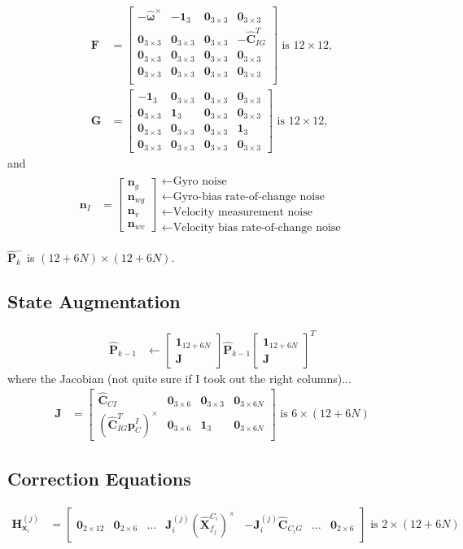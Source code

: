 \documentclass[10pt,letterpaper,fleqn,oneside]{article}
\newcommand{\nl}{\\[0.5em]}
\def\Vec#1{\mathbf{#1}} %
\newcommand{\bbm}{\begin{bmatrix}}
\newcommand{\ebm}{\end{bmatrix}}
\begin{document}
\begin{align}
\Vec{F} &= \bbm	-\hat{\boldsymbol{\omega}}^\times & -\Vec{1}_3 & \Vec{0}_{3\times3} & \Vec{0}_{3\times3} \nl
					\Vec{0}_{3\times3} & \Vec{0}_{3\times3} & \Vec{0}_{3\times3} & -\hat{\Vec{C}}_{I G}^T \nl
					\Vec{0}_{3\times3} & \Vec{0}_{3\times3} & \Vec{0}_{3\times3} & \Vec{0}_{3\times3} \nl
					\Vec{0}_{3\times3} & \Vec{0}_{3\times3} & \Vec{0}_{3\times3} & \Vec{0}_{3\times3} \nl
		\ebm \text{ is } 12\times12, \nl
\Vec{G} &= 	\bbm	-\Vec{1}_3 & \Vec{0}_{3\times3} & \Vec{0}_{3\times3} & \Vec{0}_{3\times3} \nl
								\Vec{0}_{3\times3} & \Vec{1}_3 & \Vec{0}_{3\times3} & \Vec{0}_{3\times3} \nl
								\Vec{0}_{3\times3} & \Vec{0}_{3\times3} & \Vec{0}_{3\times3} & \Vec{1}_3 \nl
								\Vec{0}_{3\times3} & \Vec{0}_{3\times3} & \Vec{0}_{3\times3} & \Vec{0}_{3\times3}
					\ebm \text{ is } 12\times12,
\end{align}
and
\begin{align}
\Vec{n}_I &= \bbm \Vec{n}_g \nl \Vec{n}_{wg} \nl \Vec{n}_v \nl \Vec{n}_{wv} \ebm
					\begin{array}{l}
					\leftarrow \text{Gyro noise} \nl
					\leftarrow \text{Gyro-bias rate-of-change noise} \nl
					\leftarrow \text{Velocity measurement noise} \nl
					\leftarrow \text{Velocity bias rate-of-change noise}
					\end{array}		
\end{align}

$\hat{\Vec{P}}^-_k$ is $(12+6N)\times(12+6N)$.

\subsection{State Augmentation}
\begin{align}
\hat{\Vec{P}}_{k-1} &\leftarrow \bbm \Vec{1}_{12+6N}  \nl \Vec{J}\ebm \hat{\Vec{P}}_{k-1} \bbm \Vec{1}_{12+6N}  \nl \Vec{J}\ebm^T
\end{align}
where the Jacobian (not quite sure if I took out the right columns)...
\begin{align}
\Vec{J} &= \bbm \hat{\Vec{C}}_{C I} & \Vec{0}_{3\times6} & \Vec{0}_{3\times3} & \Vec{0}_{3\times6N} \nl
							\left(\hat{\Vec{C}}_{I G}^T \left.\Vec{p}^I_C\right.\right)^\times & \Vec{0}_{3\times6} & \Vec{1}_3 & \Vec{0}_{3\times6N}
				\ebm \text{ is } 6\times\left(12 + 6N\right)
\end{align}

\subsection{Correction Equations}
\begin{align}
\Vec{H}^{(j)}_{\Vec{x}_i} &= \bbm \Vec{0}_{2\times12} & \Vec{0}_{2\times6} & \hdots & \Vec{J}^{\left(j\right)}_i \left(\hat{\Vec{X}}^{C_i}_{f_j}\right)^\times & -\Vec{J}^{\left(j\right)}_i \hat{\Vec{C}}_{C_i G} & \hdots & \Vec{0}_{2\times6} \ebm \text{ is } 2\times\left(12 + 6N\right)
\end{align}
\end{document}
